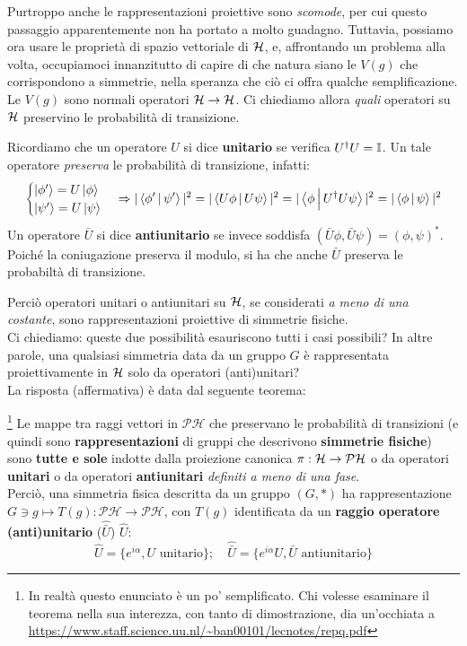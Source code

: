 \documentclass[../../FisicaTeorica.tex]{subfiles}
\begin{document}
Purtroppo anche le rappresentazioni proiettive sono \textit{scomode}, per cui questo passaggio apparentemente non ha portato a molto guadagno. Tuttavia, possiamo ora usare le proprietà di spazio vettoriale di $\mathcal{H}$, e, affrontando un problema alla volta, occupiamoci innanzitutto di capire di che natura siano le $V(g)$ che corrispondono a simmetrie, nella speranza che ciò ci offra qualche semplificazione.\\
Le $V(g)$ sono normali operatori $\mathcal{H}\to\mathcal{H}$. Ci chiediamo allora \textit{quali} operatori su $\mathcal{H}$ preservino le probabilità di transizione.
\begin{dfn}
Ricordiamo che un operatore $U$ si dice \textbf{unitario} se verifica $U^\dag U = \mathbb{I}$. Un tale operatore \textit{preserva} le probabilità di transizione, infatti:
\[
\begin{cases}
\Ket{\phi'}=U\Ket{\phi}\\
\Ket{\psi'}=U\Ket{\psi}
\end{cases}\Rightarrow |\Braket{\phi'|\psi'}|^2=|\Braket{U\phi|U\psi}|^2=|\Braket{\phi|U^\dag U \psi}|^2 =|\Braket{\phi|\psi}|^2
\]
Un operatore $\bar{U}$ si dice \textbf{antiunitario} se invece soddisfa $(\bar{U}\phi,\bar{U}\psi)=(\phi,\psi)^*$. Poiché la coniugazione preserva il modulo, si ha che anche $\bar{U}$ preserva le probabiltà di transizione.
\end{dfn}

Perciò operatori unitari o antiunitari su $\mathcal{H}$, se considerati \textit{a meno di una costante}, sono rappresentazioni proiettive di simmetrie fisiche.\\
Ci chiediamo: queste due possibilità esauriscono tutti i casi possibili? In altre parole, una qualsiasi simmetria data da un gruppo $G$ è rappresentata proiettivamente in $\mathcal{H}$ solo da operatori (anti)unitari?\\
La risposta (affermativa) è data dal seguente teorema:

\begin{thm}\footnote{In realtà questo enunciato è un po' semplificato. Chi volesse esaminare il teorema nella sua interezza, con tanto di dimostrazione, dia un'occhiata a \url{https://www.staff.science.uu.nl/~ban00101/lecnotes/repq.pdf}}
Le mappe tra raggi vettori in $\mathcal{PH}$ che preservano le probabilità di transizioni (e quindi sono \textbf{rappresentazioni} di gruppi che descrivono \textbf{simmetrie fisiche}) sono \textbf{tutte e sole} indotte dalla proiezione canonica $\pi:\mathcal{H} \to \mathcal{PH}$ o da operatori \textbf{unitari} o da operatori \textbf{antiunitari} \textit{definiti a meno di una fase}.\\
Perciò, una simmetria fisica descritta da un gruppo $(G,*)$ ha rappresentazione $G \ni g \mapsto T(g):\mathcal{PH} \to \mathcal{PH}$, con $T(g)$ identificata da un \textbf{raggio operatore (anti)unitario} ($\hat{\bar{U}}$) $\hat{U}$:
\[
\hat{U}=\{e^{i\alpha}, U \text{ unitario}\}; \quad \hat{\bar{U}}=\{e^{i\alpha} U, \bar{U} \text{ antiunitario}\} 
\]  
\end{thm}
\end{document}
